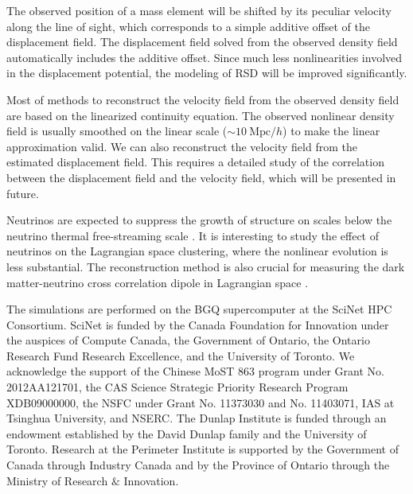 \documentclass[aps,prl,twocolumn,showpacs,superscriptaddress,groupedaddress,nofootinbib]{revtex4}  %
\newcommand{\mr}{\mathrm}
\begin{document}
The observed position of a mass element will be shifted by its peculiar
velocity along the line of sight, which corresponds to a simple additive offset of
the displacement field. The displacement field solved from the observed density field
automatically includes the additive offset. 
Since much less nonlinearities involved in the displacement potential, the modeling of RSD
will be improved significantly.

Most of methods to reconstruct the velocity field from the observed density 
field are based on the linearized continuity equation.
The observed nonlinear density field is usually smoothed on the linear scale
($\sim10\ \mr{Mpc}/h$) to make the linear approximation valid.
We can also reconstruct the velocity field from the estimated displacement 
field.
This requires a detailed study of the correlation between the displacement 
field and the velocity field, which will be presented in future.

Neutrinos are expected to suppress the growth of structure on scales below the 
neutrino thermal free-streaming scale \cite{1980bond}. 
It is interesting to study the effect of neutrinos on the Lagrangian space 
clustering, where the nonlinear evolution is less substantial. 
The reconstruction method is also crucial for measuring the dark matter-neutrino cross 
correlation dipole in Lagrangian space \cite{2014zhm,2016zhm}. 

The simulations are performed on the BGQ supercomputer at the SciNet HPC 
Consortium. SciNet is funded by the Canada Foundation for Innovation under 
the auspices of Compute Canada, the Government of Ontario, the Ontario Research 
Fund Research Excellence, and the University of Toronto.
We acknowledge the support of the Chinese MoST 863 program under Grant 
No. 2012AA121701, the CAS Science Strategic Priority Research Program 
XDB09000000, the NSFC under Grant No. 11373030 and No. 11403071, IAS at Tsinghua University, 
 and NSERC.
The Dunlap Institute is funded through an endowment established by the David Dunlap family and the University of Toronto.
Research at the Perimeter Institute is supported by the Government of Canada
through Industry Canada and by the Province of Ontario through the Ministry of
Research $\&$ Innovation.



\end{document}
